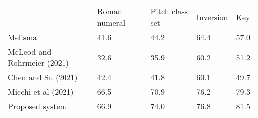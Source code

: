 \begin{tabular}{lllll}
                            & Roman numeral & Pitch class set & Inversion & Key  \\
Melisma                     & 41.6          & 44.2            & 64.4      & 57.0 \\
McLeod and Rohrmeier (2021) & 32.6          & 35.9            & 60.2      & 51.2 \\
Chen and Su (2021)          & 42.4          & 41.8            & 60.1      & 49.7 \\
Micchi et al (2021)         & 66.5          & 70.9            & 76.2      & 79.3 \\
Proposed system             & 66.9          & 74.0            & 76.8      & 81.5
\end{tabular}
